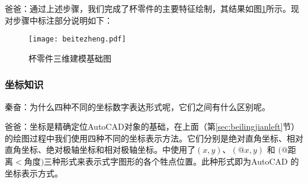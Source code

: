 \begin{procedure}
爸爸：通过上述步骤，我们完成了杯零件的主要特征绘制，其结果如图\ref{fig:bettezheng}所示。现对步骤中标注部分说明如下：
\noindent
\begin{figure}[htbp]
\centering
\texttt{[image: beitezheng.pdf]}
\caption{杯零件三维建模基础图}\label{fig:bettezheng}
\end{figure}
\end{procedure}

\subsubsection{坐标知识}
秦奋：为什么四种不同的坐标数字表达形式呢，它们之间有什么区别呢。

爸爸：坐标是精确定位AutoCAD对象的基础，在上面（第\ref{sec:beilingjianleft}节）的绘图过程中我们使用四种不同的坐标表示方法。它们分别是绝对直角坐标、相对直角坐标、绝对极轴坐标和相对极轴坐标。中使用了$(x,y)$、$(@x,y)$ 和 $(@$距离$<$角度$)$三种形式来表示式字图形的各个牲点位置。此种形式即为Auto\-CAD 的坐标表示方式。
